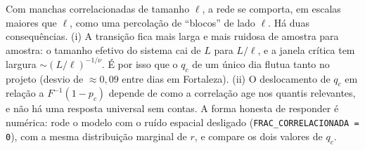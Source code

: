 \documentclass[11pt]{article}
\begin{document}
Com manchas correlacionadas de tamanho $\ell$, a rede se comporta, em escalas maiores que $\ell$, como uma percolação de ``blocos'' de lado $\ell$. Há duas consequências. (i) A transição fica mais larga e mais ruidosa de amostra para amostra: o tamanho efetivo do sistema cai de $L$ para $L/\ell$, e a janela crítica tem largura $\sim(L/\ell)^{-1/\nu}$. É por isso que o $q_c$ de um único dia flutua tanto no projeto (desvio de $\approx 0{,}09$ entre dias em Fortaleza). (ii) O deslocamento de $q_c$ em relação a $F^{-1}(1-p_c)$ depende de como a correlação age nos quantis relevantes, e não há uma resposta universal sem contas. A forma honesta de responder é numérica: rode o modelo com o ruído espacial desligado (\texttt{FRAC\_CORRELACIONADA = 0}), com a mesma distribuição marginal de $r$, e compare os dois valores de $q_c$.
\end{document}
